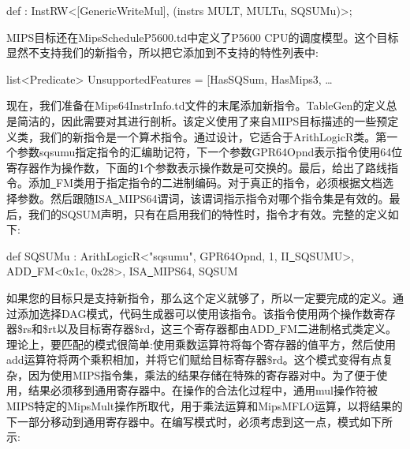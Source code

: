 \begin{tcolorbox}[colback=white,colframe=black]
def : InstRW<[GenericWriteMul], (instrs MULT, MULTu, SQSUMu)>;
\end{tcolorbox}

MIPS目标还在MipsScheduleP5600.td中定义了P5600 CPU的调度模型。这个目标显然不支持我们的新指令，所以把它添加到不支持的特性列表中:\par

\begin{tcolorbox}[colback=white,colframe=black]
list<Predicate> UnsupportedFeatures = [HasSQSum, HasMips3, … 
\end{tcolorbox}

现在，我们准备在Mips64InstrInfo.td文件的末尾添加新指令。TableGen的定义总是简洁的，因此需要对其进行剖析。该定义使用了来自MIPS目标描述的一些预定义类，我们的新指令是一个算术指令。通过设计，它适合于ArithLogicR类。第一个参数sqsumu指定指令的汇编助记符，下一个参数GPR64Opnd表示指令使用64位寄存器作为操作数，下面的1个参数表示操作数是可交换的。最后，给出了路线指令。添加\underline{~}FM类用于指定指令的二进制编码。对于真正的指令，必须根据文档选择参数。然后跟随ISA\underline{~}MIPS64谓词，该谓词指示指令对哪个指令集是有效的。最后，我们的SQSUM声明，只有在启用我们的特性时，指令才有效。完整的定义如下:\par

\begin{tcolorbox}[colback=white,colframe=black]
def SQSUMu : ArithLogicR<"sqsumu", GPR64Opnd, 1, II\underline{~}SQSUMU>, \\
\hspace*{4cm}ADD\underline{~}FM<0x1c, 0x28>, ISA\underline{~}MIPS64, SQSUM
\end{tcolorbox}

如果您的目标只是支持新指令，那么这个定义就够了，所以一定要完成的定义。通过添加选择DAG模式，代码生成器可以使用该指令。该指令使用两个操作数寄存器\$rs和\$rt以及目标寄存器\$rd，这三个寄存器都由ADD\underline{~}FM二进制格式类定义。理论上，要匹配的模式很简单:使用乘数运算符将每个寄存器的值平方，然后使用add运算符将两个乘积相加，并将它们赋给目标寄存器\$rd。这个模式变得有点复杂，因为使用MIPS指令集，乘法的结果存储在特殊的寄存器对中。为了便于使用，结果必须移到通用寄存器中。在操作的合法化过程中，通用mul操作符被MIPS特定的MipsMult操作所取代，用于乘法运算和MipsMFLO运算，以将结果的下一部分移动到通用寄存器中。在编写模式时，必须考虑到这一点，模式如下所示:\par

